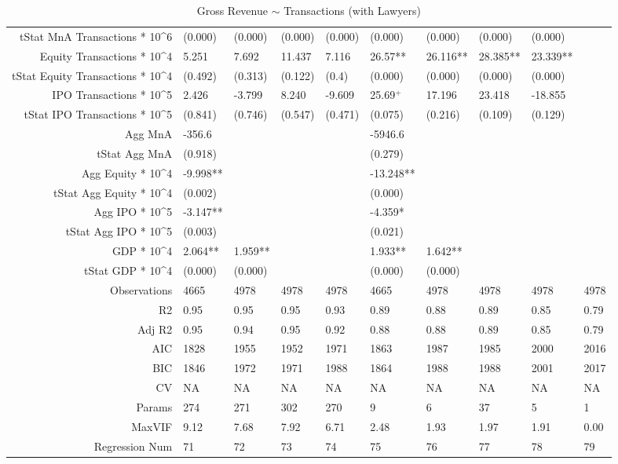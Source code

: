 \begin{table}[ht]
\begin{tabular}{rlllllllll}
  tStat MnA Transactions * 10^6 & (0.000) & (0.000) & (0.000) & (0.000) & (0.000) & (0.000) & (0.000) & (0.000) &  \\ 
  Equity Transactions * 10^4 & 5.251 & 7.692 & 11.437 & 7.116 & 26.57** & 26.116** & 28.385** & 23.339** &  \\ 
  tStat Equity Transactions * 10^4 & (0.492) & (0.313) & (0.122) & (0.4) & (0.000) & (0.000) & (0.000) & (0.000) &  \\ 
  IPO Transactions * 10^5 & 2.426 & -3.799 & 8.240 & -9.609 & 25.69$^{+}$ & 17.196 & 23.418 & -18.855 &  \\ 
  tStat IPO Transactions * 10^5 & (0.841) & (0.746) & (0.547) & (0.471) & (0.075) & (0.216) & (0.109) & (0.129) &  \\ 
  Agg MnA & -356.6 &  &  &  & -5946.6 &  &  &  &  \\ 
  tStat Agg MnA & (0.918) &  &  &  & (0.279) &  &  &  &  \\ 
  Agg Equity * 10^4 & -9.998** &  &  &  & -13.248** &  &  &  &  \\ 
  tStat Agg Equity * 10^4 & (0.002) &  &  &  & (0.000) &  &  &  &  \\ 
  Agg IPO * 10^5 & -3.147** &  &  &  & -4.359* &  &  &  &  \\ 
  tStat Agg IPO * 10^5 & (0.003) &  &  &  & (0.021) &  &  &  &  \\ 
  GDP * 10^4 & 2.064** & 1.959** &  &  & 1.933** & 1.642** &  &  &  \\ 
  tStat GDP * 10^4 & (0.000) & (0.000) &  &  & (0.000) & (0.000) &  &  &  \\ 
  Observations & 4665 & 4978 & 4978 & 4978 & 4665 & 4978 & 4978 & 4978 & 4978 \\ 
  R2 & 0.95 & 0.95 & 0.95 & 0.93 & 0.89 & 0.88 & 0.89 & 0.85 & 0.79 \\ 
  Adj R2 & 0.95 & 0.94 & 0.95 & 0.92 & 0.88 & 0.88 & 0.89 & 0.85 & 0.79 \\ 
  AIC & 1828 & 1955 & 1952 & 1971 & 1863 & 1987 & 1985 & 2000 & 2016 \\ 
  BIC & 1846 & 1972 & 1971 & 1988 & 1864 & 1988 & 1988 & 2001 & 2017 \\ 
  CV & NA & NA & NA & NA & NA & NA & NA & NA & NA \\ 
  Params & 274 & 271 & 302 & 270 & 9 & 6 & 37 & 5 & 1 \\ 
  MaxVIF & 9.12 & 7.68 & 7.92 & 6.71 & 2.48 & 1.93 & 1.97 & 1.91 & 0.00 \\ 
  Regression Num & 71 & 72 & 73 & 74 & 75 & 76 & 77 & 78 & 79 \\ 
   \hline
\end{tabular}
\caption{Gross Revenue $\sim$ Transactions (with Lawyers)} 
\end{table}
